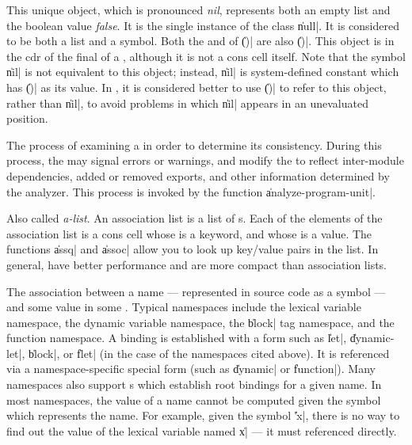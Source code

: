\begin{description}

\Gitem	{\|()|}
	{This unique object, which is pronounced {\em nil}, represents
	both an empty list and the boolean value {\em false}.  It is
	the single instance of the class \|null|.  It is considered to
	be both a list and a symbol.  Both the  and
	 of \|()| are also \|()|.  This object is in the cdr
	of the final  of a ,
	although it is not a cons cell itself.  Note that the symbol
	\|nil| is not equivalent to this object; instead, \|nil| is
	system-defined constant which has \|()| as its value.  In
	\Talk, it is considered better to use \|()| to refer to this
	object, rather than \|nil|, to avoid problems in which \|nil|
	appears in an unevaluated position.}

	{The process of examining a  in order to
	determine its consistency.  During this process, the
	 may signal errors or warnings, and modify the
	 to reflect inter-module
	dependencies, added or removed exports, and other information
	determined by the analyzer.  This process is invoked by the
	function \|analyze-program-unit|.}

	{Also called {\em a-list}.  An association list is a list of
	s.  Each of the elements of the association
	list is a cons cell whose  is a keyword, and whose
	 is a value.  The functions \|assq| and \|assoc|
	allow you to look up key/value pairs in the list.  In general,
	 have better performance and are more
	compact than association lists.}

	{The association between a name --- represented in source code
	as a symbol --- and some value in some .
	Typical namespaces include the lexical variable namespace, the
	dynamic variable namespace, the \|block| tag namespace, and
	the function namespace.  A binding is established with a form
	such as \|let|, \|dynamic-let|, \|block|, or \|flet| (in the
	case of the namespaces cited above).  It is referenced via a
	namespace-specific special form (such as \|dynamic| or
	\|function|).  Many namespaces also support s
	which establish root bindings for a given name.  In most
	namespaces, the value of a name cannot be computed given the
	symbol which represents the name.  For example, given the
	symbol \|'x|, there is no way to find out the value of the
	lexical variable named \|x| --- it must referenced directly.}


\end{description}
